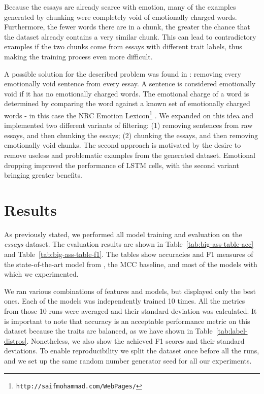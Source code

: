\documentclass[10pt, a4paper]{article}
\begin{document}
Because the essays are already scarce with emotion, many of the examples generated by chunking were completely void of emotionally charged words. Furthermore, the fewer words there are in a chunk, the greater the chance that the dataset already contains a very similar chunk. This can lead to contradictory examples if the two chunks come from essays with different trait labels, thus making the training process even more difficult.

A possible solution for the described problem was found in \citep{majumder}: removing every emotionally void sentence from every essay. A sentence is considered emotionally void if it has no emotionally charged words. The emotional charge of a word is determined by comparing the word against a known set of emotionally charged words - in this case the NRC Emotion Lexicon\footnote{\texttt{http://saifmohammad.com/WebPages/}} \citep{emoticon}. We expanded on this idea and implemented two different variants of filtering: (1) removing sentences from raw essays, and then chunking the essays; (2) chunking the essays, and then removing emotionally void chunks. The second approach is motivated by the desire to remove useless and problematic examples from the generated dataset. Emotional dropping improved the performance of LSTM cells, with the second variant bringing greater benefits.

\section{Results}
As previously stated, we performed all model training and evaluation on the \textit{essays} dataset. The evaluation results are shown in Table~\ref{tab:big-ass-table-acc} and Table~\ref{tab:big-ass-table-f1}. The tables show accuracies and F1 measures of the state-of-the-art model from \citet{majumder}, the MCC baseline, and most of the models with which we experimented.

We ran various combinations of features and models, but displayed only the best ones. Each of the models was independently trained 10 times. All the metrics from those 10 runs were averaged and their standard deviation was calculated. It is important to note that accuracy is an acceptable performance metric on this dataset because the traits are balanced, as we have shown in Table~\ref{tab:label-distros}. Nonetheless, we also show the achieved F1 scores and their standard deviations. To enable reproducibility we split the dataset once before all the runs, and we set up the same random number generator seed for all our experiments.
\end{document}
